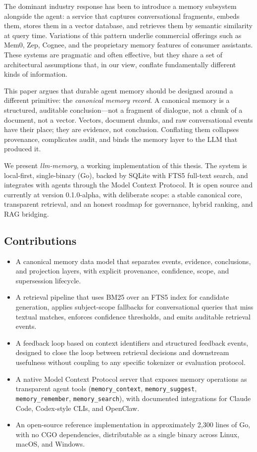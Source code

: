 \documentclass[11pt,a4paper]{article}
\begin{document}
The dominant industry response has been to introduce a memory subsystem alongside the agent: a service that captures conversational fragments, embeds them, stores them in a vector database, and retrieves them by semantic similarity at query time. Variations of this pattern underlie commercial offerings such as Mem0, Zep, Cognee, and the proprietary memory features of consumer assistants. These systems are pragmatic and often effective, but they share a set of architectural assumptions that, in our view, conflate fundamentally different kinds of information.

This paper argues that durable agent memory should be designed around a different primitive: the \emph{canonical memory record}. A canonical memory is a structured, auditable conclusion---not a fragment of dialogue, not a chunk of a document, not a vector. Vectors, document chunks, and raw conversational events have their place; they are evidence, not conclusion. Conflating them collapses provenance, complicates audit, and binds the memory layer to the LLM that produced it.

We present \textit{llm-memory}, a working implementation of this thesis. The system is local-first, single-binary (Go), backed by SQLite with FTS5 full-text search, and integrates with agents through the Model Context Protocol. It is open source and currently at version 0.1.0-alpha, with deliberate scope: a stable canonical core, transparent retrieval, and an honest roadmap for governance, hybrid ranking, and RAG bridging.

\subsection{Contributions}

\begin{itemize}
 \item A canonical memory data model that separates events, evidence, conclusions, and projection layers, with explicit provenance, confidence, scope, and supersession lifecycle.
 \item A retrieval pipeline that uses BM25 over an FTS5 index for candidate generation, applies subject-scope fallbacks for conversational queries that miss textual matches, enforces confidence thresholds, and emits auditable retrieval events.
 \item A feedback loop based on context identifiers and structured feedback events, designed to close the loop between retrieval decisions and downstream usefulness without coupling to any specific tokenizer or evaluation protocol.
 \item A native Model Context Protocol server that exposes memory operations as transparent agent tools (\texttt{memory\_context}, \texttt{memory\_suggest}, \texttt{memory\_remember}, \texttt{memory\_search}), with documented integrations for Claude Code, Codex-style CLIs, and OpenClaw.
 \item An open-source reference implementation in approximately 2{,}300 lines of Go, with no CGO dependencies, distributable as a single binary across Linux, macOS, and Windows.
\end{itemize}
\end{document}
